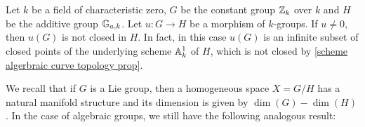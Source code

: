 \begin{example}\label{scheme alg group morphism nonclosed eg}
Let $k$ be a field of characteristic zero, $G$ be the constant group $\mathbb{Z}_k$ over $k$ and $H$ be the additive group $\mathbb{G}_{a,k}$. Let $u:G\to H$ be a morphism of $k$-groups. If $u\neq 0$, then $u(G)$ is not closed in $H$. In fact, in this case $u(G)$ is an infinite subset of closed points of the underlying scheme $\mathbb{A}_k^1$ of $H$, which is not closed by \cref{scheme algerbraic curve topology prop}.
\end{example}

We recall that if $G$ is a Lie group, then a homogeneous space $X=G/H$ has a natural manifold structure and its dimension is given by $\dim(G)-\dim(H)$. In the case of algebraic groups, we still have the following analogous result:

